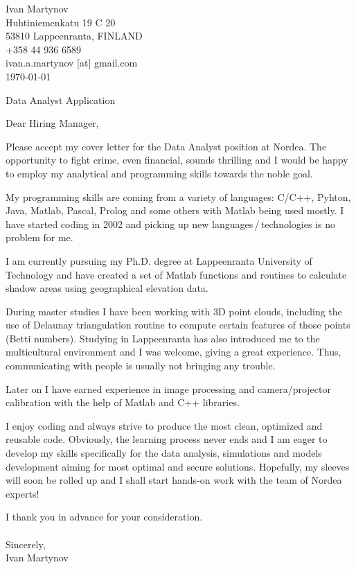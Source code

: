 \documentclass[]{article}
\begin{document}
\begin{flushright}
	Ivan Martynov\\
  Huhtiniemenkatu 19 C 20\\
	53810 Lappeenranta, FINLAND\\
	+358 44 936 6589\\
	ivan.a.martynov [at] gmail.com\\
	\today
\end{flushright}


\begin{center}
  Data Analyst Application
\end{center}

\noindent
Dear Hiring Manager,
\bigskip

\noindent
Please accept my cover letter for the Data Analyst position at Nordea.
The opportunity to fight crime, even financial, sounds thrilling and I would be
happy to employ my analytical and programming skills towards the noble goal.
\medskip

\noindent
My programming skills are coming from a variety of languages: C/C++, Pyhton,
Java, Matlab, Pascal, Prolog and some others with Matlab being used mostly. I
have started coding in 2002 and picking up new languages\,/\,technologies is no
problem for me.
\medskip

\noindent
I am currently pursuing my Ph.D. degree at Lappeenranta University of
Technology and have created a set of Matlab functions and routines to
calculate shadow areas using geographical elevation data.
\medskip

\noindent
During master studies I have been working with 3D point clouds, including the
use of Delaunay triangulation routine to compute certain features of those
points (Betti numbers).
\noindent
Studying in Lappeenranta has also introduced me to the multicultural environment
and I was welcome, giving a great experience. Thus, communicating with people is
usually not bringing any trouble.
\medskip

\noindent
Later on I have earned experience in image processing and camera/projector
calibration with the help of Matlab and C++ libraries.
\medskip

\noindent
I enjoy coding and always strive to produce the most clean, optimized and
reusable code. Obviously, the learning process never ends and I am eager to
develop my skills specifically for the data analysis, simulations and models
development aiming for most optimal and secure solutions.  Hopefully, my sleeves
will soon be rolled up and I shall start hands-on work with the team of Nordea
experts!
\medskip

\noindent
I thank you in advance for your consideration.\\\ \\

\noindent Sincerely,\\
Ivan Martynov
\end{document}
